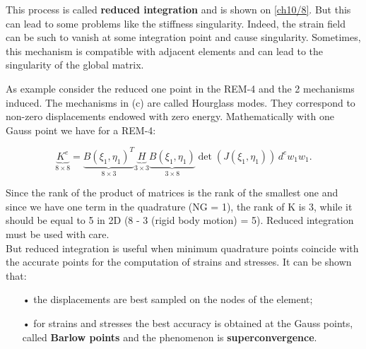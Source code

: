 	This process is called \textbf{reduced integration} and is shown on \autoref{ch10/8}. But this can lead to some problems like the stiffness singularity. Indeed, the strain field can be such to vanish at some integration point and cause singularity. Sometimes, this mechanism is compatible with adjacent elements and can lead to the singularity of the global matrix. 
	
	As example consider the reduced one point in the REM-4 and the 2 mechanisms induced.  The mechanisms in (c) are called Hourglass modes. They correspond to non-zero displacements endowed with zero energy. Mathematically with one Gauss point we have for a REM-4:
	
	\begin{equation}
	\underbrace{K^e}_{8\times 8} = \underbrace{B(\xi _1 , \eta _1)^T}_{8\times 3} \underbrace{H}_{3\times 3} \underbrace{B(\xi _1, \eta_1)}_{3\times 8} \det (J(\xi_1, \eta_1)) \, d^e w_1 w_1.  
	\end{equation}
	
	Since the rank of the product of matrices is the rank of the smallest one and since we have one term in the quadrature (NG = 1), the rank of K is 3, while it should be equal to 5 in 2D (8 - 3 (rigid body motion) = 5). Reduced integration must be used with care. \\
	
	But reduced integration is useful when minimum quadrature points coincide with the accurate points for the computation of strains and stresses. It can be shown that: 
	
	\begin{itemize}
	\item[•] the displacements are best sampled on the nodes of the element;
	
	\item[•] for strains and stresses the best accuracy is obtained at the Gauss points, called \textbf{Barlow points} and the phenomenon is \textbf{superconvergence}. 
	\end{itemize}
	
	